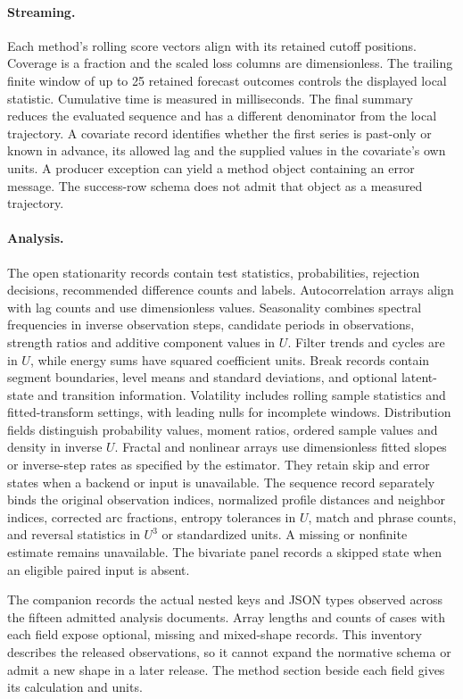 \paragraph{Streaming.}
Each method's rolling score vectors align with its retained cutoff positions. Coverage is a fraction and the scaled loss columns are dimensionless. The trailing finite window of up to 25 retained forecast outcomes controls the displayed local statistic. Cumulative time is measured in milliseconds. The final summary reduces the evaluated sequence and has a different denominator from the local trajectory. A covariate record identifies whether the first series is past-only or known in advance, its allowed lag and the supplied values in the covariate's own units. A producer exception can yield a method object containing an error message. The success-row schema does not admit that object as a measured trajectory.

\paragraph{Analysis.}
The open stationarity records contain test statistics, probabilities, rejection decisions, recommended difference counts and labels. Autocorrelation arrays align with lag counts and use dimensionless values. Seasonality combines spectral frequencies in inverse observation steps, candidate periods in observations, strength ratios and additive component values in $U$. Filter trends and cycles are in $U$, while energy sums have squared coefficient units. Break records contain segment boundaries, level means and standard deviations, and optional latent-state and transition information. Volatility includes rolling sample statistics and fitted-transform settings, with leading nulls for incomplete windows. Distribution fields distinguish probability values, moment ratios, ordered sample values and density in inverse $U$. Fractal and nonlinear arrays use dimensionless fitted slopes or inverse-step rates as specified by the estimator. They retain skip and error states when a backend or input is unavailable. The sequence record separately binds the original observation indices, normalized profile distances and neighbor indices, corrected arc fractions, entropy tolerances in $U$, match and phrase counts, and reversal statistics in $U^3$ or standardized units. A missing or nonfinite estimate remains unavailable. The bivariate panel records a skipped state when an eligible paired input is absent.

The companion  records the
actual nested keys and JSON types observed across the fifteen admitted
analysis documents. Array lengths and counts of cases with each field expose
optional, missing and mixed-shape records. This inventory describes the
released observations, so it cannot expand the normative schema or admit a
new shape in a later release. The method section beside each field gives its
calculation and units.

